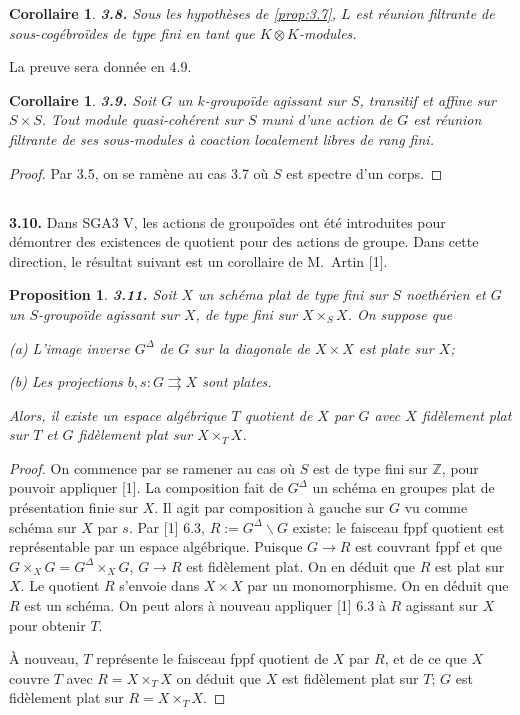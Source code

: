\documentclass[12pt,a4paper]{article}
\theoremstyle{plain}
\newtheorem{proposition}[theorem]{Proposition}
\newtheorem{corollary}[theorem]{Corollaire}
\theoremstyle{definition}
\theoremstyle{remark}
\begin{document}
\begin{corollary}\label{cor:3.8}
\textbf{3.8.} Sous les hypothèses de \ref{prop:3.7}, $L$ est réunion filtrante de sous-cogébroïdes de type fini en tant que $K \otimes K$-modules.
\end{corollary}

La preuve sera donnée en 4.9.

\begin{corollary}\label{cor:3.9}
\textbf{3.9.} Soit $G$ un $k$-groupoïde agissant sur $S$, transitif et affine sur $S \times S$. Tout module quasi-cohérent sur $S$ muni d'une action de $G$ est réunion filtrante de ses sous-modules à coaction localement libres de rang fini.
\end{corollary}

\begin{proof}
Par 3.5, on se ramène au cas 3.7 où $S$ est spectre d'un corps.
\end{proof}

\subsection{}

\textbf{3.10.} Dans SGA3 V, les actions de groupoïdes ont été introduites pour démontrer des existences de quotient pour des actions de groupe. Dans cette direction, le résultat suivant est un corollaire de M.~Artin [1].

\begin{proposition}\label{prop:3.11}
\textbf{3.11.} Soit $X$ un schéma plat de type fini sur $S$ noethérien et $G$ un $S$-groupoïde agissant sur $X$, de type fini sur $X \times_S X$. On suppose que

(a) L'image inverse $G^\Delta$ de $G$ sur la diagonale de $X \times X$ est plate sur $X$;

(b) Les projections $b,s : G \rightrightarrows X$ sont plates.

Alors, il existe un espace algébrique $T$ quotient de $X$ par $G$ avec $X$ fidèlement plat sur $T$ et $G$ fidèlement plat sur $X \times_T X$.
\end{proposition}

\begin{proof}
On commence par se ramener au cas où $S$ est de type fini sur $\mathbb{Z}$, pour pouvoir appliquer [1]. La composition fait de $G^\Delta$ un schéma en groupes plat de présentation finie sur $X$. Il agit par composition à gauche sur $G$ vu comme schéma sur $X$ par $s$. Par [1] 6.3, $R := G^\Delta \backslash G$ existe: le faisceau fppf quotient est représentable par un espace algébrique. Puisque $G \to R$ est couvrant fppf et que $G \times_X G = G^\Delta \times_X G$, $G \to R$ est fidèlement plat. On en déduit que $R$ est plat sur $X$. Le quotient $R$ s'envoie dans $X \times X$ par un monomorphisme. On en déduit que $R$ est un schéma. On peut alors à nouveau appliquer [1] 6.3 à $R$ agissant sur $X$ pour obtenir $T$.

À nouveau, $T$ représente le faisceau fppf quotient de $X$ par $R$, et de ce que $X$ couvre $T$ avec $R = X \times_T X$ on déduit que $X$ est fidèlement plat sur $T$; $G$ est fidèlement plat sur $R = X \times_T X$.
\end{proof}
\end{document}
